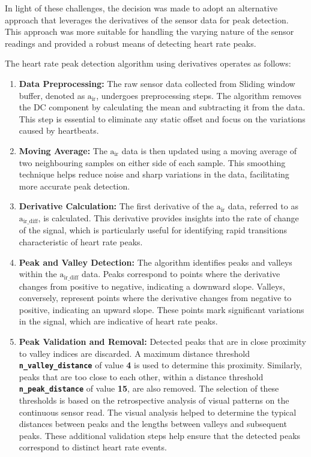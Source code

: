 \noindent In light of these challenges, the decision was made to adopt an alternative approach that leverages the derivatives of the sensor data for peak detection. This approach was more suitable for handling the varying nature of the sensor readings and provided a robust means of detecting heart rate peaks.
\vspace{1\baselineskip}

\noindent The heart rate peak detection algorithm using derivatives operates as follows:

\begin{enumerate}
    \item \textbf{Data Preprocessing:} The raw sensor data collected from Sliding window buffer, denoted as \texttt{\(\text{a}_\text{ir}\)}, undergoes preprocessing steps. The algorithm removes the DC component by calculating the mean and subtracting it from the data. This step is essential to eliminate any static offset and focus on the variations caused by heartbeats.
    
    \item \textbf{Moving Average:} The \texttt{\(\text{a}_\text{ir}\)} data is then updated using a moving average of two neighbouring samples on either side of each sample. This smoothing technique helps reduce noise and sharp variations in the data, facilitating more accurate peak detection.
    
    \item \textbf{Derivative Calculation:} The first derivative of the \texttt{\(\text{a}_\text{ir}\)} data, referred to as \texttt{\(\text{a}_\text{ir\_diff}\)}, is calculated. This derivative provides insights into the rate of change of the signal, which is particularly useful for identifying rapid transitions characteristic of heart rate peaks.
    
    \item \textbf{Peak and Valley Detection:} The algorithm identifies peaks and valleys within the \texttt{\(\text{a}_\text{ir\_diff}\)} data. Peaks correspond to points where the derivative changes from positive to negative, indicating a downward slope. Valleys, conversely, represent points where the derivative changes from negative to positive, indicating an upward slope. These points mark significant variations in the signal, which are indicative of heart rate peaks.
    
    \item \textbf{Peak Validation and Removal:} Detected peaks that are in close proximity to valley indices are discarded. A maximum distance threshold \textbf{\texttt{n\_valley\_distance}} of value \textbf{4} is used to determine this proximity. Similarly, peaks that are too close to each other, within a distance threshold \textbf{\texttt{n\_peak\_distance}} of value \textbf{15}, are also removed. The selection of these thresholds is based on the retrospective analysis of visual patterns on the continuous sensor read. The visual analysis helped to determine the typical distances between peaks and the lengths between valleys and subsequent peaks. These additional validation steps help ensure that the detected peaks correspond to distinct heart rate events.
    

\end{enumerate}
